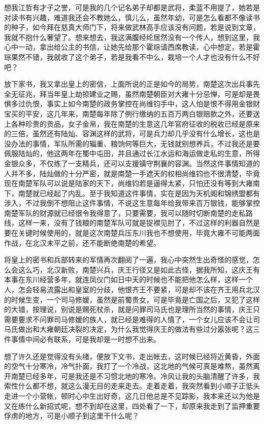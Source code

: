 想我江哲有才子之誉，可是我的几个记名弟子却都是武将，柔蓝不用提了，她若是对读书有兴趣，难道我还会不教她么，慎儿么，虽然年幼，可是怎么看都不像读书的种子，如今拜在慈真大师门下，将来做武林高手应该没有问题，若是说到文章，我就不抱什么奢望了。想来想去，我这满腹经纶居然没有一个传人，想到这里，我心中一动，拿出给公主的书信，让她先给那个霍琮请西席教读，心中想定，若是霍琮果然不错，我就收了这个弟子，若是我看不中么，栽培一个人才也没有什么不好吧？

放下家书，我又拿出皇上的密信，上面所说的正是如今的局势，南楚这次出兵事先全无征兆，拜当年皇上劫掠建业之赐，虽然南楚朝臣对大雍十分忌惮，可是却是畏惧多过仇恨，事实上如今南楚的政务掌控在尚维钧手中，这人怕是恨不得用金银财宝买的平安，这几年来，南楚每年除了例行缴纳的五百万两白银赔款之外，还要送上各种珍贵的贡品，女子金帛，我在南楚的生意这几年官府征收的税收已经是原来的三倍，虽然还有陆灿、容渊这样的武将，可是兵力却几乎没有什么增长，这也是没办法的事情，军队所需的辎重、粮饷何等巨大，无钱就别想养兵，不过我还是要佩服陆灿的，他这两年在蜀中屯田，并且通过长江水运和海运做走私的生意，所得金银众多，不仅练了一支精兵，还可以支援镇守荆襄的容渊。当然这件事情知道的人并不多，陆灿做的十分严密，就是南楚一手遮天的权相尚维钧也不很清楚，毕竟现在南楚军队可以说是陆家的天下，尚维钧若是逼得太紧，只怕还没有等到大雍南下，南楚就已经起了内乱。至于我知道这件事情，实在是因为天机阁和锦绣盟都有涉入，不过我倒不想阻止这件事情，不说这生意每年给我带来百万银钱，能够掌控南楚军队的财源就已经很令我得意了，只要需要，我可以随时切断南楚的走私路线，这样一来，没有了钱粮的南楚军队可就是捉襟见肘了，不过这样的利器自然是要在关键时候使用的，就是这次南楚兵压东川我也不想使用，毕竟大雍不可能两面作战，在北汉未平之前，还不能断绝南楚的希望。

将皇上的密书和兵部转来的军情再次翻阅了一遍，我心中突然生出奇怪的感觉，怎么会这么巧，北汉新败，南楚兴兵，庆王行径又是如此古怪，据我所知，这庆王有本事在东川经营多年，就连凤仪门如日中天的时候也不能把他怎么样，这样一个人，怎会轻易流露出和皇室的分歧，他恨齐王不要紧，可是却不该在齐王用兵北汉的时候生变，一个司马修嫒，虽然是前蜀贵女，可是毕竟是亡国之后，又犯了这样的大错，按理说，别说是赐死杖杀，就是问罪司马氏也是理所当然的事情，庆王只需要要求不问罪司马修嫒的族人，就已经是难得的人情了，一个女儿应该不会让司马氏做出和大雍朝廷决裂的决定，为什么我觉得庆王的做法有些过分嚣张呢？这三件事情中间必有联系，可是我却是一时想不出来。

想了许久还是觉得没有头绪，便放下文书，走出帐去，这时候已经将近黄昏，外面的空气十分寒冷，冷气扑面，我打了一个冷战，这北地的气候可真是难熬，虽然离开南楚已经多年，可是我还是不习惯北地的寒冷。冷风让我的头脑清醒了许多，我索性什么都不想，就这么漫无目的走来走去。走着走着，我突然看到小顺子正低头走进一个小营帐，顿时心中生出好奇，这几日他总是不见踪影，我本来还以为他是又在练什么新招式呢，想不到却在这里，四处看了一下，却原来我走到了监押重要俘虏的地方，可是小顺子到这里干什么呢？

